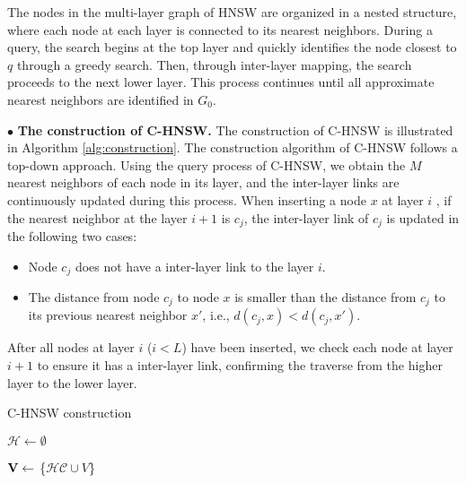 The nodes in the multi-layer graph of HNSW are organized in a nested structure, where each node at each layer is connected to its nearest neighbors. 
% 
During a query, the search begins at the top layer and quickly identifies the node closest to $q$ through a greedy search.
% 
Then, through inter-layer mapping, the search proceeds to the next lower layer.
% 
This process continues until all approximate nearest neighbors are identified in $G_0$.


$\bullet$ \textbf{The construction of C-HNSW. } 
The construction of C-HNSW is illustrated in Algorithm \ref{alg:construction}.
% 
The construction algorithm of C-HNSW follows a top-down approach. 
% 
Using the query process of C-HNSW, we obtain the $M$ nearest neighbors of each node in its layer, and the inter-layer links are continuously updated during this process.
% 
When inserting a node $x$ at layer $i$ , if the nearest neighbor at the layer $i+1$ is $c_j$, the inter-layer link of $c_j$ is updated in the following two cases:
\begin{itemize}
    \item Node $c_j$ does not have a inter-layer link to the layer $i$.
    \item The distance from node $c_j$ to node $x$ is smaller than the distance from $c_j$ to its previous nearest neighbor $x'$, i.e., $d(c_j,x) < d(c_j,x')$.
\end{itemize}

After all nodes at layer $i$ ($i<L$) have been inserted, we check each node at layer $i+1$ to ensure it has a inter-layer link, confirming the traverse from the higher layer to the lower layer.
% 

\begin{algorithm}[ht]
  \caption{{C-HNSW construction}}
  \label{alg:construction}
  \small
    $\mathcal{H}\gets\emptyset$\;
    
    ${\bf V}\gets$ \{$\mathcal{HC} \cup V$\} \tcp{\textcolor{teal}{Get all nodes of each layer.}}
\end{algorithm}


